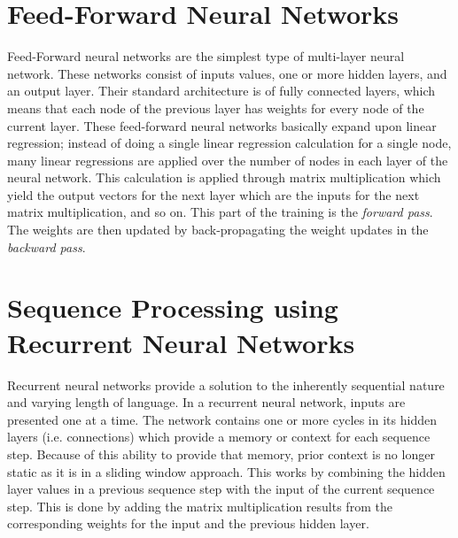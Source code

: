 \documentclass[12pt]{report}
\begin{document}
\section{Feed-Forward Neural Networks}
Feed-Forward neural networks are the simplest type of multi-layer neural
network.  These networks consist of inputs values, one or more hidden layers,
and an output layer.  Their standard architecture is of fully connected layers,
which means that each node of the previous layer has weights for every node of
the current layer.  These feed-forward neural networks basically expand upon
linear regression; instead of doing a single linear regression calculation for a
single node, many linear regressions are applied over the number of nodes in
each layer of the neural network.  This calculation is applied through matrix
multiplication which yield the output vectors for the next layer which are the
inputs for the next matrix multiplication, and so on.  This part of the training
is the \emph{forward pass}.  The weights are then updated by back-propagating the
weight updates in the \emph{backward pass}.

\section{Sequence Processing using Recurrent Neural Networks}
Recurrent neural networks provide a solution to the inherently sequential nature
and varying length of language.  In a recurrent neural network, inputs are
presented one at a time. The network contains one or more cycles in its hidden
layers (i.e. connections) which provide a memory or context for each sequence
step. Because of this ability to provide that memory, prior context is no longer
static as it is in a sliding window approach.  This works by combining the
hidden layer values in a previous sequence step with the input of the current
sequence step.  This is done by adding the matrix multiplication results from
the corresponding weights for the input and the previous hidden layer.
\end{document}
